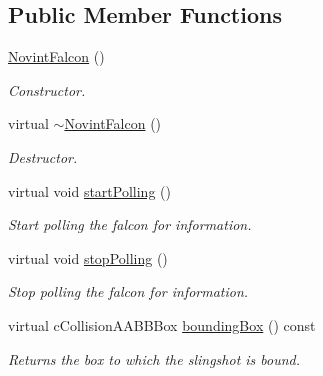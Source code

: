 \subsection*{Public Member Functions}
\begin{DoxyCompactItemize}
\item 
\hyperlink{classNovintFalcon_ac36e7148131ecbdfff97289f2c9e3b9c}{NovintFalcon} ()
\begin{DoxyCompactList}\small\item\em Constructor. \item\end{DoxyCompactList}\item 
\hypertarget{classNovintFalcon_afb0ece97317db2eb6da852e219cc85eb}{
virtual \hyperlink{classNovintFalcon_afb0ece97317db2eb6da852e219cc85eb}{$\sim$NovintFalcon} ()}
\label{classNovintFalcon_afb0ece97317db2eb6da852e219cc85eb}

\begin{DoxyCompactList}\small\item\em Destructor. \item\end{DoxyCompactList}\item 
\hypertarget{classNovintFalcon_a3e82b6e9d7c393684b809971208922bf}{
virtual void \hyperlink{classNovintFalcon_a3e82b6e9d7c393684b809971208922bf}{startPolling} ()}
\label{classNovintFalcon_a3e82b6e9d7c393684b809971208922bf}

\begin{DoxyCompactList}\small\item\em Start polling the falcon for information. \item\end{DoxyCompactList}\item 
\hypertarget{classNovintFalcon_a3bc94cd6f05df1d327f79fb87001039d}{
virtual void \hyperlink{classNovintFalcon_a3bc94cd6f05df1d327f79fb87001039d}{stopPolling} ()}
\label{classNovintFalcon_a3bc94cd6f05df1d327f79fb87001039d}

\begin{DoxyCompactList}\small\item\em Stop polling the falcon for information. \item\end{DoxyCompactList}\item 
virtual cCollisionAABBBox \hyperlink{classNovintFalcon_a8226c5b4a2cb0d2e88b6a41e2c7c3af9}{boundingBox} () const 
\begin{DoxyCompactList}\small\item\em Returns the box to which the slingshot is bound. \item\end{DoxyCompactList}\end{DoxyCompactItemize}


